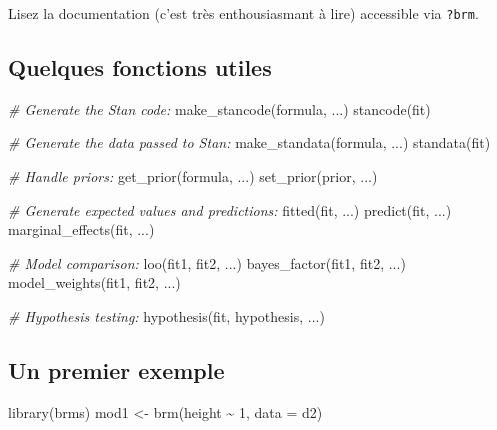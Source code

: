 \documentclass[
  a4paper,11pt,twoside,onecolumn,openright,final,oldfontcommands]{memoir}
\newenvironment{Shaded}{\begin{snugshade}}{\end{snugshade}}
\newcommand{\AttributeTok}[1]{\textcolor[rgb]{0.77,0.63,0.00}{#1}}
\newcommand{\CommentTok}[1]{\textcolor[rgb]{0.56,0.35,0.01}{\textit{#1}}}
\newcommand{\DecValTok}[1]{\textcolor[rgb]{0.00,0.00,0.81}{#1}}
\newcommand{\FunctionTok}[1]{\textcolor[rgb]{0.00,0.00,0.00}{#1}}
\newcommand{\NormalTok}[1]{#1}
\newcommand{\OtherTok}[1]{\textcolor[rgb]{0.56,0.35,0.01}{#1}}
\newcommand{\SpecialCharTok}[1]{\textcolor[rgb]{0.00,0.00,0.00}{#1}}
\theoremstyle{definition}
\theoremstyle{definition}
\theoremstyle{definition}
\theoremstyle{remark}
\begin{document}
Lisez la documentation (c'est très enthousiasmant à lire) accessible via \texttt{?brm}.

\hypertarget{quelques-fonctions-utiles}{%
\subsection{Quelques fonctions utiles}\label{quelques-fonctions-utiles}}

\begin{Shaded}
\begin{Highlighting}[]
\CommentTok{\# Generate the Stan code:}
\FunctionTok{make\_stancode}\NormalTok{(formula, ...)}
\FunctionTok{stancode}\NormalTok{(fit)}

\CommentTok{\# Generate the data passed to Stan:}
\FunctionTok{make\_standata}\NormalTok{(formula, ...)}
\FunctionTok{standata}\NormalTok{(fit)}

\CommentTok{\# Handle priors:}
\FunctionTok{get\_prior}\NormalTok{(formula, ...)}
\FunctionTok{set\_prior}\NormalTok{(prior, ...)}

\CommentTok{\# Generate expected values and predictions:}
\FunctionTok{fitted}\NormalTok{(fit, ...)}
\FunctionTok{predict}\NormalTok{(fit, ...)}
\FunctionTok{marginal\_effects}\NormalTok{(fit, ...)}

\CommentTok{\# Model comparison:}
\FunctionTok{loo}\NormalTok{(fit1, fit2, ...)}
\FunctionTok{bayes\_factor}\NormalTok{(fit1, fit2, ...)}
\FunctionTok{model\_weights}\NormalTok{(fit1, fit2, ...)}

\CommentTok{\# Hypothesis testing:}
\FunctionTok{hypothesis}\NormalTok{(fit, hypothesis, ...)}
\end{Highlighting}
\end{Shaded}

\hypertarget{un-premier-exemple}{%
\subsection{Un premier exemple}\label{un-premier-exemple}}

\begin{Shaded}
\begin{Highlighting}[]
\FunctionTok{library}\NormalTok{(brms)}
\NormalTok{mod1 }\OtherTok{\textless{}{-}} \FunctionTok{brm}\NormalTok{(height }\SpecialCharTok{\textasciitilde{}} \DecValTok{1}\NormalTok{, }\AttributeTok{data =}\NormalTok{ d2)}
\end{Highlighting}
\end{Shaded}
\end{document}
